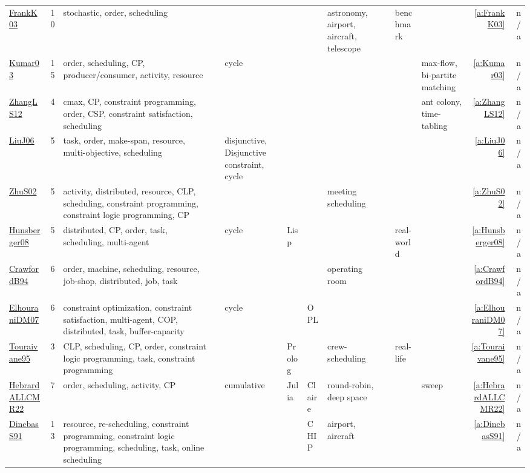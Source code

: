 {\begin{longtable}{>{\raggedright\arraybackslash}p{3cm}r>{\raggedright\arraybackslash}p{4cm}p{1.5cm}p{2cm}p{1.5cm}p{1.5cm}p{1.5cm}p{1.5cm}p{2cm}p{1.5cm}rr}
\href{../works/FrankK03.pdf}{FrankK03}~\cite{FrankK03} & 10 & stochastic, order, scheduling &  &  &  &  & astronomy, airport, aircraft, telescope &  & benchmark &  & \ref{a:FrankK03} & n/a\\
\href{../works/Kumar03.pdf}{Kumar03}~\cite{Kumar03} & 15 & order, scheduling, CP, producer/consumer, activity, resource &  & cycle &  &  &  &  &  & max-flow, bi-partite matching & \ref{a:Kumar03} & n/a\\
\href{../works/ZhangLS12.pdf}{ZhangLS12}~\cite{ZhangLS12} & 4 & cmax, CP, constraint programming, order, CSP, constraint satisfaction, scheduling &  &  &  &  &  &  &  & ant colony, time-tabling & \ref{a:ZhangLS12} & n/a\\
\href{../works/LiuJ06.pdf}{LiuJ06}~\cite{LiuJ06} & 5 & task, order, make-span, resource, multi-objective, scheduling &  & disjunctive, Disjunctive constraint, cycle &  &  &  &  &  &  & \ref{a:LiuJ06} & n/a\\
\href{../works/ZhuS02.pdf}{ZhuS02}~\cite{ZhuS02} & 5 & activity, distributed, resource, CLP, scheduling, constraint programming, constraint logic programming, CP &  &  &  &  & meeting scheduling &  &  &  & \ref{a:ZhuS02} & n/a\\
\href{../works/Hunsberger08.pdf}{Hunsberger08}~\cite{Hunsberger08} & 5 & distributed, CP, order, task, scheduling, multi-agent &  & cycle & Lisp &  &  &  & real-world &  & \ref{a:Hunsberger08} & n/a\\
\href{../works/CrawfordB94.pdf}{CrawfordB94}~\cite{CrawfordB94} & 6 & order, machine, scheduling, resource, job-shop, distributed, job, task &  &  &  &  & operating room &  &  &  & \ref{a:CrawfordB94} & n/a\\
\href{../works/ElhouraniDM07.pdf}{ElhouraniDM07}~\cite{ElhouraniDM07} & 6 & constraint optimization, constraint satisfaction, multi-agent, COP, distributed, task, buffer-capacity &  & cycle &  & OPL &  &  &  &  & \ref{a:ElhouraniDM07} & n/a\\
\href{../works/Touraivane95.pdf}{Touraivane95}~\cite{Touraivane95} & 3 & CLP, scheduling, CP, order, constraint logic programming, task, constraint programming &  &  & Prolog &  & crew-scheduling &  & real-life &  & \ref{a:Touraivane95} & n/a\\
\href{../works/HebrardALLCMR22.pdf}{HebrardALLCMR22}~\cite{HebrardALLCMR22} & 7 & order, scheduling, activity, CP &  & cumulative & Julia & Claire & round-robin, deep space &  &  & sweep & \ref{a:HebrardALLCMR22} & n/a\\
\href{../works/DincbasS91.pdf}{DincbasS91}~\cite{DincbasS91} & 13 & resource, re-scheduling, constraint programming, constraint logic programming, scheduling, task, online scheduling &  &  &  & CHIP & airport, aircraft &  &  &  & \ref{a:DincbasS91} & n/a\\
\end{longtable}
}

